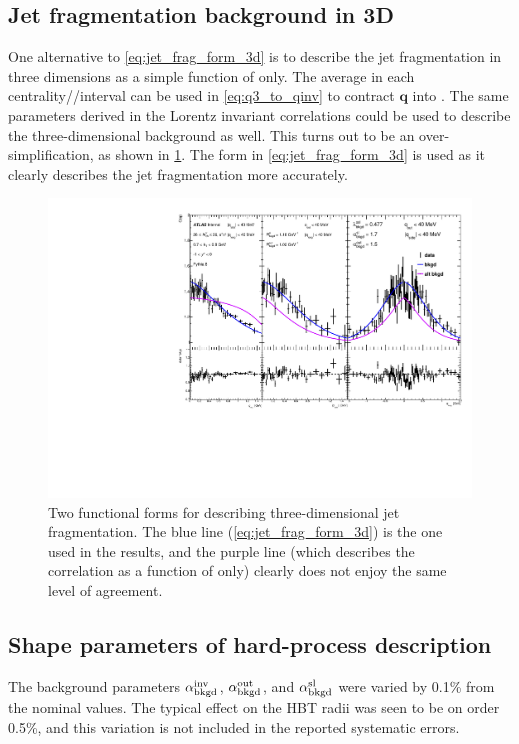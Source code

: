 \subsection{Jet fragmentation background in 3D}

One alternative to \cref{eq:jet_frag_form_3d} is to describe the jet fragmentation in three dimensions as a simple function of \qinv only.
The average \kt in each centrality/\kt/\kys interval can be used in \cref{eq:q3_to_qinv} to contract $\mathbf{q}$ into \qinv.
The same parameters derived in the Lorentz invariant correlations could be used to describe the three-dimensional background as well.
This turns out to be an over-simplification, as shown in \cref{fig:pythia_qosl_alt_bkgd}.
The form in \cref{eq:jet_frag_form_3d} is used as it clearly describes the jet fragmentation more accurately.

\begin{figure}[t]
\begin{minipage}[t]{\textwidth}
\centering
\includegraphics[width=\linewidth]{can_Cqosl_pythia_altbkgd_cent7_e3_kt6_ys1.pdf}
\end{minipage}
\caption{Two functional forms for describing three-dimensional jet fragmentation. The blue line (\cref{eq:jet_frag_form_3d}) is the one used in the results, and the purple line (which describes the correlation as a function of \qinv only) clearly does not enjoy the same level of agreement.}
\label{fig:pythia_qosl_alt_bkgd}
\end{figure}


\subsection{Shape parameters of hard-process description}
The background parameters $\alpha_{\mathrm{bkgd}}^\mathrm{inv}$, $\alpha_{\mathrm{bkgd}}^\mathrm{out}$, and $\alpha_{\mathrm{bkgd}}^\mathrm{sl}$ were varied by 0.1\% from the nominal values.
The typical effect on the HBT radii was seen to be on order 0.5\%, and this variation is not included in the reported systematic errors.

